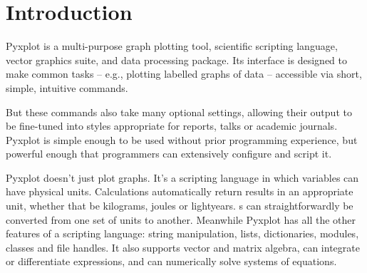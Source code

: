 %
%
%
%
%



\chapter{Introduction}

\label{ch:introduction}

Pyxplot is a multi-purpose graph plotting tool, scientific scripting language,
vector graphics suite, and data processing package.  Its interface is designed
to make common tasks -- e.g., plotting labelled graphs of data -- accessible
via short, simple, intuitive commands.

But these commands also take many optional settings, allowing their output to
be fine-tuned into styles appropriate for reports, talks or academic journals.
Pyxplot is simple enough to be used without prior programming experience, but
powerful enough that programmers can extensively configure and script it.


Pyxplot doesn't just plot graphs. It's a scripting language in which variables
can have physical units. Calculations automatically return results in an
appropriate unit, whether that be kilograms, joules or lightyears.  \Datafile s
can straightforwardly be converted from one set of units to another. Meanwhile
Pyxplot has all the other features of a scripting language: string
manipulation, lists, dictionaries, modules, classes and file handles.  It also
supports vector and matrix algebra, can integrate or differentiate expressions,
and can numerically solve systems of equations.


